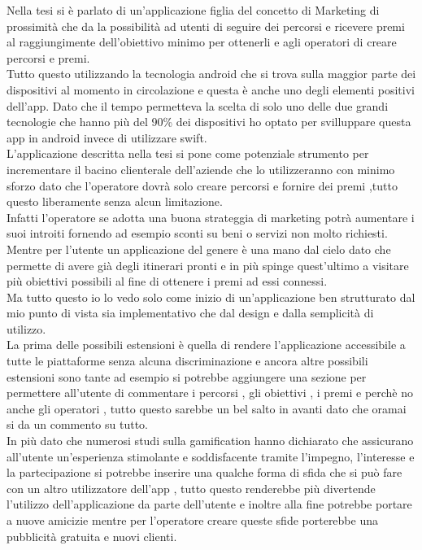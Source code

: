 Nella tesi si è parlato di un'applicazione figlia del concetto di Marketing di prossimità che da la possibilità ad utenti di seguire dei percorsi e ricevere premi al raggiungimente dell'obiettivo minimo per ottenerli e agli operatori di creare percorsi e premi.\\

Tutto questo utilizzando la tecnologia android che si trova sulla maggior parte dei dispositivi al momento in circolazione e questa è anche uno degli elementi positivi dell'app.
Dato che il tempo permetteva la scelta di solo uno delle due grandi tecnologie che hanno più del 90\% dei dispositivi ho optato per svilluppare questa app in android invece di utilizzare swift.\\

L'applicazione descritta nella tesi si pone come potenziale strumento per incrementare il bacino clienterale dell'aziende che lo utilizzeranno con minimo sforzo dato che l'operatore dovrà solo creare percorsi e fornire dei premi ,tutto questo liberamente senza alcun limitazione.\\
Infatti l'operatore se adotta una buona strateggia di marketing potrà aumentare i suoi introiti fornendo ad esempio sconti su beni o servizi non molto richiesti.\\
Mentre per l'utente un applicazione del genere è una mano dal cielo dato che permette di avere già degli itinerari pronti e in più spinge quest'ultimo a visitare più obiettivi possibili al fine di ottenere i premi ad essi connessi.\\

Ma tutto questo io lo vedo solo come inizio di un'applicazione ben strutturato dal mio punto di vista sia implementativo che dal design e dalla semplicità di utilizzo.\\

La prima delle possibili estensioni è quella di rendere l'applicazione accessibile a tutte le piattaforme senza alcuna discriminazione e ancora altre possibili estensioni sono tante ad esempio si potrebbe aggiungere una sezione per permettere all'utente di commentare i percorsi , gli obiettivi , i premi e perchè no anche gli operatori , tutto questo sarebbe un bel salto in avanti dato che oramai si da un commento su tutto.\\
In più dato che numerosi studi sulla gamification hanno dichiarato che assicurano all'utente un'esperienza stimolante e soddisfacente tramite l'impegno, l'interesse e la partecipazione si potrebbe inserire una qualche forma di sfida che si può fare con un altro utilizzatore dell'app , tutto questo renderebbe più divertende l'utilizzo dell'applicazione da parte dell'utente e inoltre alla fine potrebbe portare a nuove amicizie mentre per l'operatore creare queste sfide porterebbe una pubblicità gratuita e nuovi clienti. 


